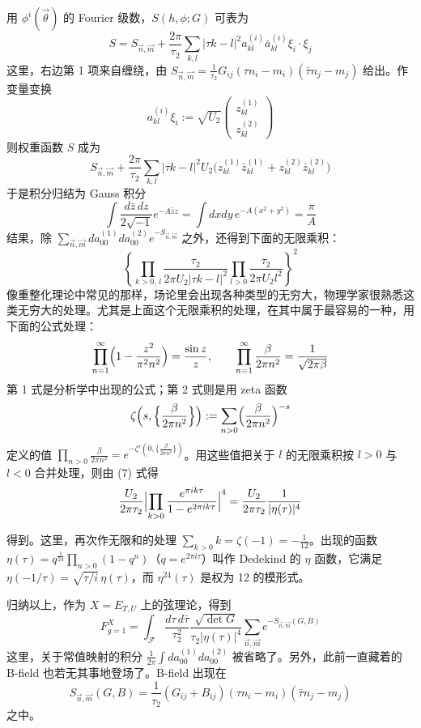 用 $\phi^i(\vec\theta)$ 的 Fourier 级数，$S(h,\phi;G)$ 可表为
\[
  S=S_{\vec n,\vec m}+\frac{2\pi}{\tau_2}\sum_{k,l}|\tau k-l|^2
  a_{kl}^{(i)}\bar a_{kl}^{(i)}\xi_i\cdot\xi_j
\]
这里，右边第 1 项来自缠绕，由 $S_{\vec n,\vec m}=\frac{1}{\tau_2}G_{ij}(\tau n_i-m_i)(\bar\tau n_j-m_j)$ 给出。作变量变换
\[
  a_{kl}^{(i)}\xi_i:=\sqrt{U_2}
  \begin{pmatrix} z_{kl}^{(1)}\\ z_{kl}^{(2)}\end{pmatrix}
\]
则权重函数 $S$ 成为
\[
  S_{\vec n,\vec m}+\frac{2\pi}{\tau_2}\sum_{k,l}|\tau k-l|^2U_2
  \bigl(z_{kl}^{(1)}\bar z_{kl}^{(1)}+z_{kl}^{(2)}\bar z_{kl}^{(2)}\bigr)
\]
于是积分归结为 Gauss 积分
\[
  \int\frac{d\bar z\,dz}{2\sqrt{-1}}e^{-A\bar zz}
  =\int dxdy\,e^{-A(x^2+y^2)}=\frac{\pi}{A}
\]
结果，除 $\sum_{\vec n,\vec m}da_{00}^{(1)}da_{00}^{(2)}e^{-S_{\vec n,\vec m}}$ 之外，还得到下面的无限乘积：
\begin{equation}
  \left\{\prod_{k>0,\,l}\frac{\tau_2}{2\pi U_2|\tau k-l|^2}
  \prod_{l>0}\frac{\tau_2}{2\pi U_2l^2}\right\}^2
  \tag{7}
\end{equation}
像重整化理论中常见的那样，场论里会出现各种类型的无穷大，物理学家很熟悉这类无穷大的处理。尤其是上面这个无限乘积的处理，在其中属于最容易的一种，用下面的公式处理：
\[
  \prod_{n=1}^{\infty}\Bigl(1-\frac{z^2}{\pi^2n^2}\Bigr)=\frac{\sin z}{z},
  \qquad
  \prod_{n=1}^{\infty}\frac{\beta}{2\pi n^2}=\frac{1}{\sqrt{2\pi\beta}}
\]
第 1 式是分析学中出现的公式；第 2 式则是用 zeta 函数
\[
  \zeta\Bigl(s,\Bigl\{\frac{\beta}{2\pi n^2}\Bigr\}\Bigr)
  :=\sum_{n>0}\Bigl(\frac{\beta}{2\pi n^2}\Bigr)^{-s}
\]
定义的值 $\prod_{n>0}\frac{\beta}{2\pi n^2}=e^{-\zeta'(0,\{\frac{\beta}{2\pi n^2}\})}$。用这些值把关于 $l$ 的无限乘积按 $l>0$ 与 $l<0$ 合并处理，则由 (7) 式得
\[
  \frac{U_2}{2\pi\tau_2}\Bigl|\prod_{k>0}\frac{e^{\pi ik\tau}}{1-e^{2\pi ik\tau}}\Bigr|^4
  =\frac{U_2}{2\pi\tau_2}\frac{1}{|\eta(\tau)|^4}
\]

得到。这里，再次作无限和的处理 $\sum_{k>0}k=\zeta(-1)=-\frac{1}{12}$。出现的函数 $\eta(\tau)=q^{\frac{1}{24}}\prod_{n>0}(1-q^n)$（$q=e^{2\pi i\tau}$）叫作 Dedekind 的 $\eta$ 函数，它满足 $\eta(-1/\tau)=\sqrt{\tau/i}\,\eta(\tau)$，而 $\eta^{24}(\tau)$ 是权为 12 的模形式。

归纳以上，作为 $X=E_{T,U}$ 上的弦理论，得到
\begin{equation}
  F_{g=1}^X=\int_{\mathcal{F}}\frac{d\tau\,d\bar\tau}{\tau_2^2}
  \frac{\sqrt{\det G}}{\tau_2|\eta(\tau)|^4}
  \sum_{\vec n,\vec m}e^{-S_{\vec n,\vec m}(G,B)}
  \tag{8}
\end{equation}
这里，关于常值映射的积分 $\frac{1}{2\pi}\int da_{00}^{(1)}da_{00}^{(2)}$ 被省略了。另外，此前一直藏着的 B-field 也若无其事地登场了。B-field 出现在
\[
  S_{\vec n,\vec m}(G,B)=\frac{1}{\tau_2}(G_{ij}+B_{ij})
  (\tau n_i-m_i)(\bar\tau n_j-m_j)
\]
之中。

